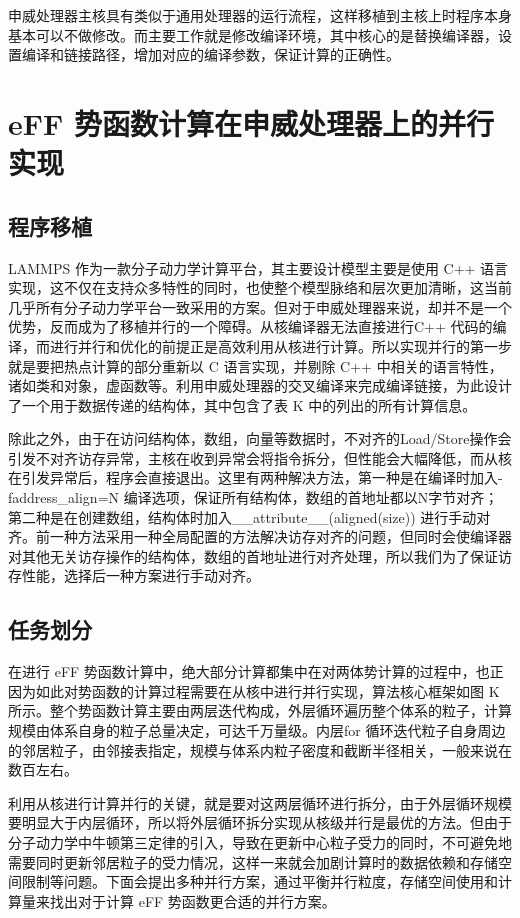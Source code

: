 申威处理器主核具有类似于通用处理器的运行流程，这样移植到主核上时程序本身基本可以不做修改。而主要工作就是修改编译环境，其中核心的是替换编译器，设置编译和链接路径，增加对应的编译参数，保证计算的正确性。

\section{eFF 势函数计算在申威处理器上的并行实现}
\subsection{程序移植}
LAMMPS 作为一款分子动力学计算平台，其主要设计模型主要是使用 C++ 语言实现，这不仅在支持众多特性的同时，也使整个模型脉络和层次更加清晰，这当前几乎所有分子动力学平台一致采用的方案。但对于申威处理器来说，却并不是一个优势，反而成为了移植并行的一个障碍。从核编译器无法直接进行C++ 代码的编译，而进行并行和优化的前提正是高效利用从核进行计算。所以实现并行的第一步就是要把热点计算的部分重新以 C 语言实现，并剔除 C++ 中相关的语言特性，诸如类和对象，虚函数等。利用申威处理器的交叉编译来完成编译链接，为此设计了一个用于数据传递的结构体，其中包含了表 K 中的列出的所有计算信息。

除此之外，由于在访问结构体，数组，向量等数据时，不对齐的Load/Store操作会引发不对齐访存异常，主核在收到异常会将指令拆分，但性能会大幅降低，而从核在引发异常后，程序会直接退出。这里有两种解决方法，第一种是在编译时加入-faddress\_align=N 编译选项，保证所有结构体，数组的首地址都以N字节对齐；第二种是在创建数组，结构体时加入\_\_attribute\_\_(aligned(size)) 进行手动对齐。前一种方法采用一种全局配置的方法解决访存对齐的问题，但同时会使编译器对其他无关访存操作的结构体，数组的首地址进行对齐处理，所以我们为了保证访存性能，选择后一种方案进行手动对齐。

\subsection{任务划分}
在进行 eFF 势函数计算中，绝大部分计算都集中在对两体势计算的过程中，也正因为如此对势函数的计算过程需要在从核中进行并行实现，算法核心框架如图 K 所示。整个势函数计算主要由两层迭代构成，外层循环遍历整个体系的粒子，计算规模由体系自身的粒子总量决定，可达千万量级。内层for 循环迭代粒子自身周边的邻居粒子，由邻接表指定，规模与体系内粒子密度和截断半径相关，一般来说在数百左右。

利用从核进行计算并行的关键，就是要对这两层循环进行拆分，由于外层循环规模要明显大于内层循环，所以将外层循环拆分实现从核级并行是最优的方法。但由于分子动力学中牛顿第三定律的引入，导致在更新中心粒子受力的同时，不可避免地需要同时更新邻居粒子的受力情况，这样一来就会加剧计算时的数据依赖和存储空间限制等问题。下面会提出多种并行方案，通过平衡并行粒度，存储空间使用和计算量来找出对于计算 eFF 势函数更合适的并行方案。

